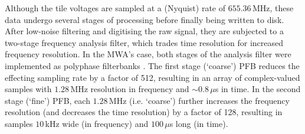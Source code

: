 \documentclass{pasa}%
\begin{document}
Although the tile voltages are sampled at a (Nyquist) rate of $655.36\,$MHz, these data undergo several stages of processing before finally being written to disk.
After low-noise filtering and digitising the raw signal, they are subjected to a two-stage frequency analysis filter, which trades time resolution for increased frequency resolution.
In the MWA's case, both stages of the analysis filter were implemented as polyphase filterbanks \citep[PFBs;][\dots]{Harris2011,Prabu2015}.
The first stage (`coarse') PFB reduces the effecting sampling rate by a factor of 512, resulting in an array of complex-valued samples with $1.28\,$MHz resolution in frequency and $\sim0.8\,\mu$s in time.
In the second stage (`fine') PFB, each $1.28\,$MHz (i.e. `coarse') further increases the frequency resolution (and decreases the time resolution) by a factor of 128, resulting in samples $10\,$kHz wide (in frequency) and $100\,\mu$s long (in time).
\end{document}
